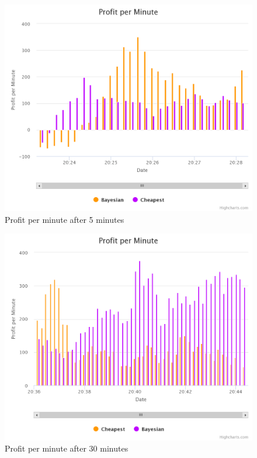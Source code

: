 \documentclass[sigconf]{acmart}
\begin{document}
\begin{figure}[!htb]
  \includegraphics[width=\columnwidth]{pictures/ppm_5.png}
  \caption{Profit per minute after 5 minutes}
  \label{fig:ppm_5}
\end{figure}
\begin{figure}[!htb]
  \includegraphics[width=\columnwidth]{pictures/ppm_25.png}
  \caption{Profit per minute after 30 minutes}
  \label{fig:ppm_25}
\end{figure}
\end{document}
